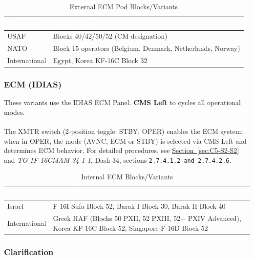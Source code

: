 \documentclass[11pt, a4paper, twoside]{report}
\newcommand{\dashrefs}[1]{\textit{TO 1F-16CMAM-34-1-1}, Dash-34, sections \texttt{#1}}
\newcommand{\secref}[1]{\hyperref[#1]{Section~\ref*{#1}}}
\begin{document}
\begin{table}[h]
\centering
\caption{External ECM Pod Blocks/Variants}
\label{tab:C5-S3-external-ecm-pods}
\small
\renewcommand{\arraystretch}{1.25}
\begin{tabular}{|>{\raggedright\arraybackslash}p{3.0cm}|>{\raggedright\arraybackslash}p{5.8cm}|}
\hline
\rowcolor{headerblue}
\textcolor{white}{\textbf{Operator}} & \textcolor{white}{\textbf{Block/Variant}} \\
\hline
USAF & Blocks 40/42/50/52 (CM designation) \\
\hline
NATO & Block 15 operators (Belgium, Denmark, Netherlands, Norway) \\
\hline
International & Egypt, Korea KF-16C Block 32 \\
\hline
\end{tabular}
\end{table}

\subsubsection{ECM (IDIAS)}
\label{sec:C5-S3-S1-S2}

These variants use the IDIAS ECM Panel. \textbf{CMS Left} to cycles all operational modes.\\\\
The XMTR switch (2-position toggle: STBY, OPER) enables the ECM system; when in OPER, the mode (AVNC, ECM or STBY) is selected via CMS Left and determines ECM behavior. For detailed procedures, see \secref{sec:C5-S2-S2} and \dashrefs{2.7.4.1.2 and 2.7.4.2.6}.
\begin{table}[h]
\centering
\caption{Internal ECM Blocks/Variants}
\label{tab:C5-S3-internal-ecm}
\small
\renewcommand{\arraystretch}{1.25}
\begin{tabular}{|>{\raggedright\arraybackslash}p{3.0cm}|>{\raggedright\arraybackslash}p{5.8cm}|}
\hline
\rowcolor{headerblue}
\textcolor{white}{\textbf{Operator}} & \textcolor{white}{\textbf{Block/Variant}} \\
\hline
Israel & F-16I Sufa Block 52, Barak I Block 30, Barak II Block 40 \\
\hline
International & Greek HAF (Blocks 50 PXII, 52 PXIII, 52+ PXIV Advanced), Korea KF-16C Block 52, Singapore F-16D Block 52 \\
\hline
\end{tabular}
\end{table}

\subsubsection{Clarification}
\label{sec:C5-S3-S1-S3}
\end{document}
